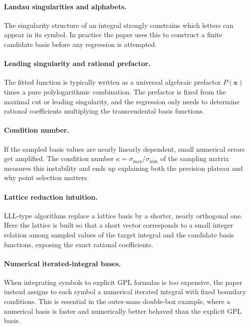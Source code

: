\documentclass[11pt]{article}
\newcommand{\bx}{\mathbf{x}}
\begin{document}
\paragraph{Landau singularities and alphabets.}
The singularity structure of an integral strongly constrains which letters can appear in its symbol. In practice the paper uses this to construct a finite candidate basis before any regression is attempted.

\paragraph{Leading singularity and rational prefactor.}
The fitted function is typically written as a universal algebraic prefactor $P(\bx)$ times a pure polylogarithmic combination. The prefactor is fixed from the maximal cut or leading singularity, and the regression only needs to determine rational coefficients multiplying the transcendental basis functions.

\paragraph{Condition number.}
If the sampled basis values are nearly linearly dependent, small numerical errors get amplified. The condition number $\kappa=\sigma_{\max}/\sigma_{\min}$ of the sampling matrix measures this instability and ends up explaining both the precision plateau and why point selection matters.

\paragraph{Lattice reduction intuition.}
LLL-type algorithms replace a lattice basis by a shorter, nearly orthogonal one. Here the lattice is built so that a short vector corresponds to a small integer relation among sampled values of the target integral and the candidate basis functions, exposing the exact rational coefficients.

\paragraph{Numerical iterated-integral bases.}
When integrating symbols to explicit GPL formulas is too expensive, the paper instead assigns to each symbol a numerical iterated integral with fixed boundary conditions. This is essential in the outer-mass double-box example, where a numerical basis is faster and numerically better behaved than the explicit GPL basis.
\end{document}
